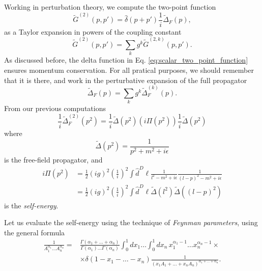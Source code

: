 \documentclass{article}
\numberwithin{equation}{section}
\begin{document}
Working in perturbation theory, we compute the two-point function
\begin{equation} \label{eq:scalar_two_point_function}
    \tilde{G}^{(2)}(p, p') = \hat{\delta}(p + p')\frac{1}{i}\tilde{\Delta}_F(p),
\end{equation}
as a Taylor expansion in powers of the coupling constant 
\begin{equation}
    \tilde{G}^{(2)}(p, p') = \sum_k g^k\tilde{G}^{(2,k)}(p, p'). 
\end{equation}
As discussed before, the delta function in Eq. \ref{eq:scalar_two_point_function} ensures momentum conservation. For all pratical purposes, we should remember that it is there, and work in the perturbative expansion of the full propagator 
\begin{equation}
    \tilde{\Delta}_F(p) = \sum_k g^k \tilde{\Delta}_F^{(k)}(p).
\end{equation}
From our previous computations %
\begin{equation}
    \frac{1}{i}\tilde{\Delta}_F^{(2)}(p^2) = \frac{1}{i} \tilde{\Delta}(p^2) \left(i \Pi(p^2)\right) \frac{1}{i} \tilde{\Delta}(p^2)
\end{equation}
where 
\begin{equation}
    \tilde{\Delta}(p^2) = \frac{1}{p^2 + m^2 + i\epsilon}
\end{equation}
is the free-field propagator, and 
\begin{equation}
\begin{aligned}
    i\Pi(p^2) &= \frac{1}{2}(ig)^2 \left(\frac{1}{i}\right)^2 \int \hat{d}^D\ell \frac{1}{l^2 - m^2 + i\epsilon} \frac{1}{(l - p)^2 - m^2 + i\epsilon}\\
    &= \frac{1}{2}(ig)^2 \left(\frac{1}{i}\right)^2 \int \hat{d}^D\ell \tilde{\Delta}(l^2) \tilde{\Delta}((l-p)^2)
\end{aligned}
\end{equation}
is the \textit{self-energy}.

Let us evaluate the self-energy using the technique of \textit{Feynman parameters}, using the general formula 
\begin{equation}
\begin{aligned}
    \frac{1}{A_1^{\alpha_1} \dots A_n^{\alpha_n}} = &\frac{\Gamma(\alpha_1 + \dots + \alpha_n)}{\Gamma(\alpha_1) \dots \Gamma(\alpha_n)} \int_0^1 dx_1 \dots \int_0^1 dx_n \, x_1^{\alpha_1 - 1} \dots x_n^{\alpha_n - 1} \times \\
    &\times \delta(1 - x_1 - \dots - x_n) \frac{1}{\left(x_1 A_1 + \dots + x_n A_n\right)^{\alpha_1 + \dots + \alpha_n}}.
\end{aligned}
\end{equation}
\end{document}
